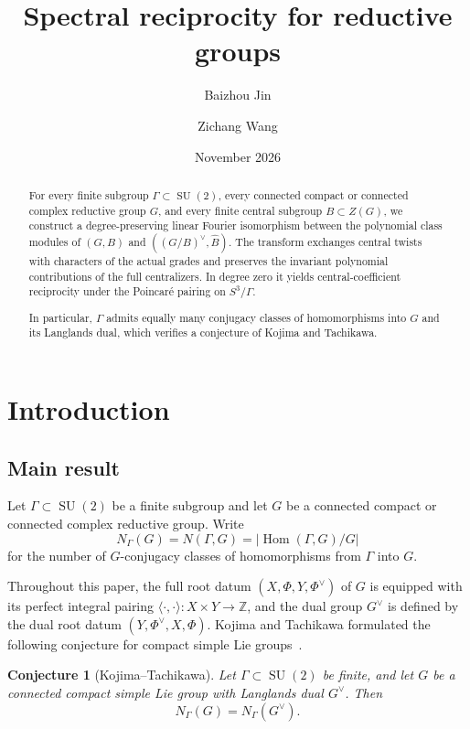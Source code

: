 \documentclass[11pt,a4paper,reqno]{amsart}
\title[Spectral reciprocity for reductive groups]{Spectral reciprocity for reductive groups}
\author{Baizhou Jin}
\author{Zichang Wang}
\date{November 2026}
\theoremstyle{plain}
\newtheorem{conjecture}[theorem]{Conjecture}
\theoremstyle{definition}
\theoremstyle{remark}
\numberwithin{equation}{section}
\DeclareMathOperator{\Hom}{Hom}
\newcommand{\SU}{\operatorname{SU}}
\newcommand{\ZZ}{\mathbb Z}
\newcommand{\pair}[2]{\langle #1,#2\rangle}
\begin{document}
\begin{abstract}
For every finite subgroup $\Gamma\subset\SU(2)$, every connected compact or connected complex reductive group $G$, and every finite central subgroup $B\subset Z(G)$, we construct a degree-preserving linear Fourier isomorphism between the polynomial class modules of $(G,B)$ and $((G/B)^\vee,\widehat B)$. The transform exchanges central twists with characters of the actual grades and preserves the invariant polynomial contributions of the full centralizers. In degree zero it yields central-coefficient reciprocity under the Poincar\'e pairing on $S^3/\Gamma$. 

In particular, $\Gamma$ admits equally many conjugacy classes of homomorphisms into $G$ and its Langlands dual, which verifies a conjecture of Kojima and Tachikawa.
\end{abstract}
\maketitle
\tableofcontents

\clearpage
\section{Introduction}
\subsection{Main result}
Let $\Gamma\subset\SU(2)$ be a finite subgroup and let $G$ be a connected compact or connected complex reductive group. Write
\[
N_\Gamma(G)=N(\Gamma,G)=|\Hom(\Gamma,G)/G|
\]
for the number of $G$-conjugacy classes of homomorphisms from $\Gamma$ into $G$.

Throughout this paper, the full root datum $(X,\Phi,Y,\Phi^\vee)$ of $G$ is equipped with its perfect integral pairing $\pair{\cdot}{\cdot}\colon X\times Y\to\ZZ$, and the dual group $G^\vee$ is defined by the dual root datum $(Y,\Phi^\vee,X,\Phi)$. Kojima and Tachikawa formulated the following conjecture for compact simple Lie groups~\cite[Conjecture~1.2]{kojima-tachikawa}.

\begin{conjecture}[Kojima--Tachikawa]\label{Conj.num}
Let $\Gamma\subset\SU(2)$ be finite, and let $G$ be a connected compact simple Lie group with Langlands dual $G^\vee$. Then
\[
N_\Gamma(G)=N_\Gamma(G^\vee).
\]
\end{conjecture}
\end{document}
